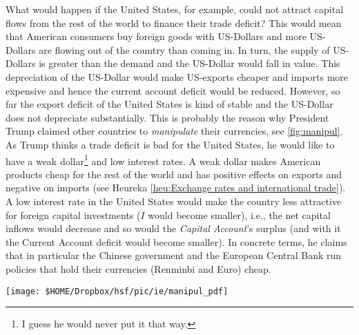 What would happen if the United States, for example, could not attract capital flows from the rest of the world to finance their trade deficit? 
This would mean that American consumers buy foreign goods with US-Dollars and more US-Dollars are flowing out of the country than coming in. In turn, the supply of US-Dollars is greater than the demand and the US-Dollar would fall in value. This depreciation of the US-Dollar would make US-exports cheaper and imports more expensive and hence the current account deficit would be reduced. However, so far the export deficit of the United States is kind of stable and the US-Dollar does not depreciate substantially. 
This is probably the reason why President Trump claimed other countries to \textit{manipulate} their currencies, see \autoref{fig:manipul}. 
As Trump thinks a trade deficit is bad for the United States, he would like to have a weak dollar\footnote{I guess he would never put it that way.} and low interest rates. 
A weak dollar makes American products cheap for the rest of the world and has positive effects on exports and negative on imports (see Heureka \ref{heu:Exchange rates and international trade}). A low interest rate in the United States would make the country less attractive for foreign capital investments ($I$ would become smaller), i.e., the net capital inflows would decrease and so would the \textit{Capital Account}'s surplus (and with it the Current Account deficit would become smaller).  
In concrete terms, he claims that in particular the Chinese government and the European Central Bank run policies that hold their currencies (Renminbi and Euro) cheap.
\bigskip
\begin{center}
	\texttt{[image: \$HOME/Dropbox/hsf/pic/ie/manipul\_pdf]}
		\label{fig:manipul}
\end{center} 



%

%
